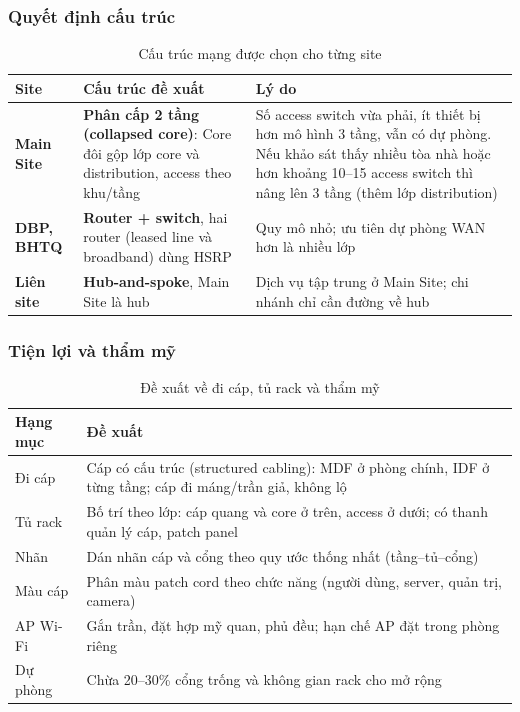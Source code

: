 \subsubsection{Quyết định cấu trúc}
\begin{small}
\setlength{\tabcolsep}{4pt}
\begin{longtable}{|p{2.3cm}|p{5.6cm}|p{5.9cm}|}
\caption{Cấu trúc mạng được chọn cho từng site} \label{tab:structure_choice} \\
\hline
\textbf{Site} & \textbf{Cấu trúc đề xuất} & \textbf{Lý do} \\ \hline
\endhead
\textbf{Main Site} & \textbf{Phân cấp 2 tầng (collapsed core)}: Core đôi gộp lớp core và distribution, access theo khu/tầng & Số access switch vừa phải, ít thiết bị hơn mô hình 3 tầng, vẫn có dự phòng. Nếu khảo sát thấy nhiều tòa nhà hoặc hơn khoảng 10--15 access switch thì nâng lên 3 tầng (thêm lớp distribution) \\ \hline
\textbf{DBP, BHTQ} & \textbf{Router + switch}, hai router (leased line và broadband) dùng HSRP & Quy mô nhỏ; ưu tiên dự phòng WAN hơn là nhiều lớp \\ \hline
\textbf{Liên site} & \textbf{Hub-and-spoke}, Main Site là hub & Dịch vụ tập trung ở Main Site; chi nhánh chỉ cần đường về hub \\ \hline
\end{longtable}
\end{small}

\subsubsection{Tiện lợi và thẩm mỹ}
\begin{small}
\setlength{\tabcolsep}{4pt}
\begin{longtable}{|p{2.6cm}|p{11.2cm}|}
\caption{Đề xuất về đi cáp, tủ rack và thẩm mỹ} \label{tab:aesthetics} \\
\hline
\textbf{Hạng mục} & \textbf{Đề xuất} \\ \hline
\endhead
Đi cáp & Cáp có cấu trúc (structured cabling): MDF ở phòng chính, IDF ở từng tầng; cáp đi máng/trần giả, không lộ \\ \hline
Tủ rack & Bố trí theo lớp: cáp quang và core ở trên, access ở dưới; có thanh quản lý cáp, patch panel \\ \hline
Nhãn & Dán nhãn cáp và cổng theo quy ước thống nhất (tầng--tủ--cổng) \\ \hline
Màu cáp & Phân màu patch cord theo chức năng (người dùng, server, quản trị, camera) \\ \hline
AP Wi-Fi & Gắn trần, đặt hợp mỹ quan, phủ đều; hạn chế AP đặt trong phòng riêng \\ \hline
Dự phòng & Chừa 20--30\% cổng trống và không gian rack cho mở rộng \\ \hline
\end{longtable}
\end{small}

